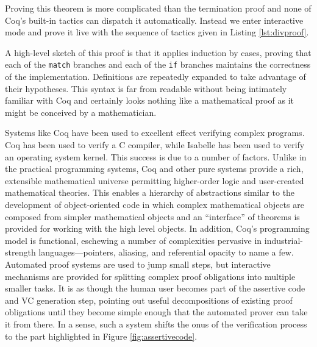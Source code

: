 

Proving this theorem is more complicated than the termination proof and none of Coq's built-in tactics can dispatch it automatically.  Instead we enter interactive mode and prove it live with the sequence of tactics given in Listing \ref{lst:divproof}.



A high-level sketch of this proof is that it applies induction by cases, proving that each of the \texttt{match} branches and each of the \texttt{if} branches maintains the correctness of the implementation.  Definitions are repeatedly expanded to take advantage of their hypotheses.  This syntax is far from readable without being intimately familiar with Coq and certainly looks nothing like a mathematical proof as it might be conceived by a mathematician.

Systems like Coq have been used to excellent effect verifying complex programs.  Coq has been used to verify a C compiler\cite{leroyVerifiedcompiler}, while Isabelle has been used to verify an operating system kernel\cite {kleinVerifiedOS}.  This success is due to a number of factors.  Unlike in the practical programming systems, Coq and other pure systems provide a rich, extensible mathematical universe permitting higher-order logic and user-created mathematical theories.  This enables a hierarchy of abstractions similar to the development of object-oriented code in which complex mathematical objects are composed from simpler mathematical objects and an ``interface'' of theorems is provided for working with the high level objects.  In addition, Coq's programming model is functional, eschewing a number of complexities pervasive in industrial-strength languages---pointers, aliasing, and referential opacity to name a few.  Automated proof systems are used to jump small steps, but interactive mechanisms are provided for splitting complex proof obligations into multiple smaller tasks.  It is as though the human user becomes part of the assertive code and VC generation step, pointing out useful decompositions of existing proof obligations until they become simple enough that the automated prover can take it from there.  In a sense, such a system shifts the onus of the verification process to the part highlighted in Figure \ref{fig:assertivecode}.

